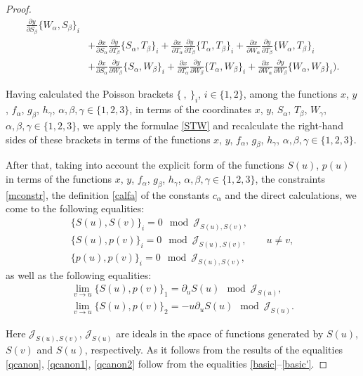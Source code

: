 \documentclass[10pt,a4paper]{amsart}
\def\a{\alpha}
\def\b{\beta}
\def\g{\gamma}
\numberwithin{equation}{section}
\begin{document}
\begin{proof}
\begin{align*}
\frac{\partial y}{\partial S_{ \b}}\{W_{\a},S_{\b}\}_i
 \\
 &+ \frac{\partial x}{\partial S_{ \a}}
\frac{\partial y}{\partial T_{ \b}}\{S_{\a},T_{\b}\}_i+ \frac{\partial x}{\partial T_{ \a}} \frac{\partial y}{\partial
T_{ \b}}\{T_{\a},T_{\b}\}_i +\frac{\partial x}{\partial W_{ \a}}
\frac{\partial y}{\partial T_{ \b}}\{W_{\a},T_{\b}\}_i
\\
&+ \frac{\partial x}{\partial S_{ \a}}
\frac{\partial y}{\partial W_{ \b}}\{S_{\a},W_{\b}\}_i+ \frac{\partial x}{\partial T_{ \a}} \frac{\partial y}{\partial
W_{ \b}}\{T_{\a},W_{\b}\}_i +\frac{\partial x}{\partial W_{ \a}}
\frac{\partial y}{\partial W_{ \b}}\{W_{\a},W_{\b}\}_i \biggr).
\end{align*}

Having calculated the Poisson brackets $\{\ ,\ \}_i$, $i\in \{1,2\}$, among the functions $x$, $y$, $f_{\a}$, $g_{\b}$, $h_{\g}$, $\a,\b,\g \in \{1,2,3\}$, in terms of the coordinates $x$, $y$, $S_{\a}$, $T_{\b}$, $W_{\g}$, $\a,\b,\g \in \{1,2,3\}$, we apply the formulae \eqref{STW} and recalculate the right-hand sides of these brackets in terms of the functions $x$, $y$, $f_{\a}$, $g_{\b}$, $h_{\g}$, $\a,\b,\g \in \{1,2,3\}$.

After that, taking into account the explicit form of the functions $S(u)$, $p(u)$ in terms of the functions $x$, $y$, $f_{\a}$, $g_{\b}$, $h_{\g}$, $\a,\b,\g \in \{1,2,3\}$, the constraints \eqref{mconstr}, the definition \eqref{calfa} of the constants $c_{\a}$ and the direct calculations, we come to the following equalities:
\begin{subequations}\label{basic}
\begin{gather}
\{ S(u), S(v)\}_i= 0 \mod \mathcal{J}_{S(u), S(v)},
\\
\{ S(u), p(v)\}_i= 0 \mod \mathcal{J}_{S(u), S(v)}, \qquad u\neq v,
\\
\{ p(u), p(v)\}_i= 0 \mod \mathcal{J}_{S(u), S(v)},
\end{gather}
\end{subequations}
as well as the following equalities:{\samepage
\begin{gather}
\lim_{v\rightarrow u} \{ S(u), p(v)\}_1= \partial_{u} S(u) \mod \mathcal{J}_{S(u)}, \nonumber\\
 \lim_{v\rightarrow u} \{ S(u), p(v)\}_2= - u \partial_{u} S(u) \mod \mathcal{J}_{S(u)}.\label{basic'}
\end{gather}}%

\noindent
Here $\mathcal{J}_{S(u), S(v)}$, $\mathcal{J}_{S(u)}$ are ideals in the space of functions generated by $S(u)$, $S(v)$ and $S(u)$, respectively.
As it follows from the results of \cite{SkrDub2018} the equalities \eqref{qcanon}, \eqref{qcanon1}, \eqref{qcanon2} follow from the equalities \eqref{basic}--\eqref{basic'}.



\end{proof}
\end{document}
